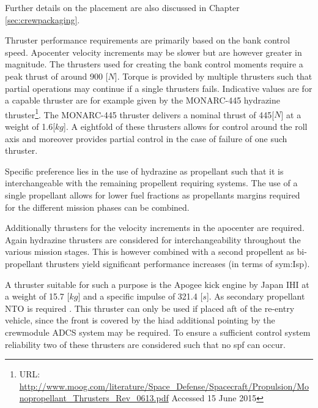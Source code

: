 Further details on the placement are also discussed in Chapter \ref{sec:crewpackaging}.

Thruster performance requirements are primarily based on the bank control speed. Apocenter velocity increments may be slower but are however greater in magnitude. The thrusters used for creating the bank control moments require a peak thrust of around 900 [$N$]. Torque is provided by multiple thrusters such that partial operations may continue if a single thrusters fails.
 Indicative values are for a capable thruster are for example given by the  MONARC-445 hydrazine thruster\footnote{URL: \url{http://www.moog.com/literature/Space\_Defense/Spacecraft/Propulsion/Monopropellant\_Thrusters\_Rev\_0613.pdf} Accessed 15 June 2015}. The MONARC-445 thruster delivers a nominal thrust of 445[$N$] at a weight of 1.6[$kg$].  A eightfold of these thrusters allows for control around the roll axis and moreover provides partial control in the case of failure of one such thruster.
 
Specific preference lies in the use of hydrazine as propellant such that it is interchangeable with the remaining propellent requiring systems. The use of a single propellant allows for lower fuel fractions as propellants margins required for the different mission phases can be combined.

Additionally thrusters for the velocity increments in the apocenter are required. Again hydrazine thrusters are considered for interchangeability throughout the various mission stages. This is however combined with a second propellent as bi-propellant thrusters yield significant performance increases (in terms of \gls{sym:Isp})\cite{Wertz2011}. 

A thruster suitable for such a purpose is the Apogee kick engine by Japan IHI at a weight of 15.7 [$kg$] and a specific impulse of 321.4 [$s$]. As secondary propellant NTO is required \cite[p.538]{Wertz2011}. This thruster can only be used if placed aft of the re-entry vehicle, since the front is covered by the \gls{hiad} additional pointing by the crewmodule ADCS system may be required. To ensure a sufficient control system reliability two of these thrusters are considered such that no \acrfull{spf} can occur. 

